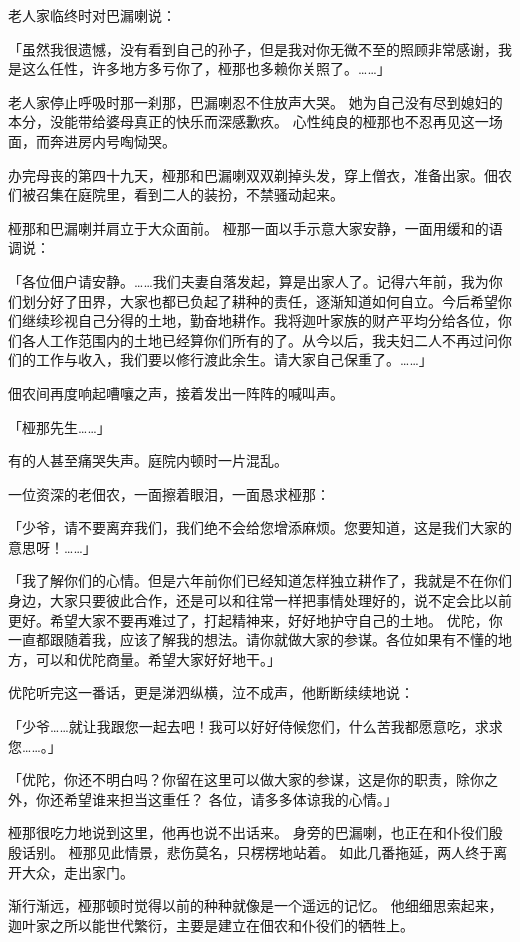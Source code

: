 \documentclass[twoside,openany]{book}
\begin{document}
老人家临终时对巴漏喇说：

「虽然我很遗憾，没有看到自己的孙子，但是我对你无微不至的照顾非常感谢，我是这么任性，许多地方多亏你了，桠那也多赖你关照了。……」

老人家停止呼吸时那一刹那，巴漏喇忍不住放声大哭。
她为自己没有尽到媳妇的本分，没能带给婆母真正的快乐而深感歉疚。
心性纯良的桠那也不忍再见这一场面，而奔进房内号啕恸哭。

办完母丧的第四十九天，桠那和巴漏喇双双剃掉头发，穿上僧衣，准备出家。佃农们被召集在庭院里，看到二人的装扮，不禁骚动起来。

桠那和巴漏喇并肩立于大众面前。
桠那一面以手示意大家安静，一面用缓和的语调说：

「各位佃户请安静。……我们夫妻自落发起，算是出家人了。记得六年前，我为你们划分好了田界，大家也都已负起了耕种的责任，逐渐知道如何自立。今后希望你们继续珍视自己分得的土地，勤奋地耕作。我将迦叶家族的财产平均分给各位，你们各人工作范围内的土地已经算你们所有的了。从今以后，我夫妇二人不再过问你们的工作与收入，我们要以修行渡此余生。请大家自己保重了。……」

佃农间再度响起嘈嚷之声，接着发出一阵阵的喊叫声。

「桠那先生……」

有的人甚至痛哭失声。庭院内顿时一片混乱。

一位资深的老佃农，一面擦着眼泪，一面恳求桠那：

「少爷，请不要离弃我们，我们绝不会给您增添麻烦。您要知道，这是我们大家的意思呀！……」

「我了解你们的心情。但是六年前你们已经知道怎样独立耕作了，我就是不在你们身边，大家只要彼此合作，还是可以和往常一样把事情处理好的，说不定会比以前更好。希望大家不要再难过了，打起精神来，好好地护守自己的土地。
优陀，你一直都跟随着我，应该了解我的想法。请你就做大家的参谋。各位如果有不懂的地方，可以和优陀商量。希望大家好好地干。」

优陀听完这一番话，更是涕泗纵横，泣不成声，他断断续续地说：

「少爷……就让我跟您一起去吧！我可以好好侍候您们，什么苦我都愿意吃，求求您……。」

「优陀，你还不明白吗？你留在这里可以做大家的参谋，这是你的职责，除你之外，你还希望谁来担当这重任？
各位，请多多体谅我的心情。」

桠那很吃力地说到这里，他再也说不出话来。
身旁的巴漏喇，也正在和仆役们殷殷话别。
桠那见此情景，悲伤莫名，只楞楞地站着。
如此几番拖延，两人终于离开大众，走出家门。

渐行渐远，桠那顿时觉得以前的种种就像是一个遥远的记忆。
他细细思索起来，迦叶家之所以能世代繁衍，主要是建立在佃农和仆役们的牺牲上。
\end{document}
